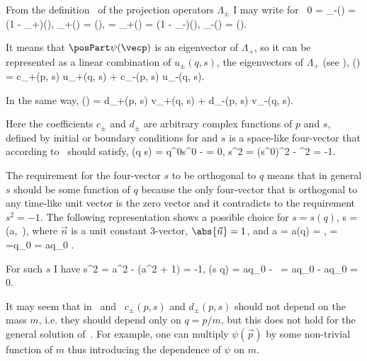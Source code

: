 From the definition~ of the projection operators 
$\Lambda_\pm$ I may write for~
0 = \Lambda_-\posPart\psi(\vecp) = (1 - \Lambda_+)\posPart\psi(\vecp),
\quad \Lambda_+\posPart\psi(\vecp) = \posPart\psi(\vecp),
\ee
{} = \Lambda_+\negPart\psi(\vecp) = (1 - \Lambda_-)\negPart\psi(\vecp),
\quad \Lambda_-\negPart\psi(\vecp) = \negPart\psi(\vecp).
\ee

It means that $\posPart\psi(\vecp)$ is an eigenvector of $\Lambda_+$,
so it can be represented as a linear combination of  $u_\pm(q, s)$,
the eigenvectors of $\Lambda_+$ (see ),
\posPart\psi(\vecp) = c_+(p, s) u_+(q, s) + c_-(p, s) u_-(q, s).
\ee

In the same way,
\negPart\psi(\vecp) = d_+(p, s) v_+(q, s) + d_-(p, s) v_-(q, s).
\ee

Here the coefficients $c_\pm$ and $d_\pm$ are arbitrary complex functions
of $p$ and $s$,
defined by initial or boundary conditions for 
and $s$ is a space-like four-vector that according to~
should satisfy, 
\be
(q \cdot s) = q^0s^0 -  = 0, 
\quad s^2 = (s^0)^2 - ^2 = -1.
\ee

The requirement for the four-vector $s$ to be orthogonal to $q$ means that 
in general $s$ should be some function of $q$ because the only four-vector
that is orthogonal to any time-like unit vector is the zero vector
and it contradicts to the requirement $s^2 = -1$. The following
representation shows a possible choice for $s = s(q)$,
\be
s = (a, \,), 
\ee
where $\vec{n}$ is a unit constant 3-vector, $\abs{\vec{n}} = 1$,
and
\be 
a = a(q) 
= { \cdot {} \over 
   }, 
\ee
\be
{} 
= 
={q_0 \over {}} 
= a{q_0 \over {} \cdot {}}
.      
\ee

For such $s$ I have
\be
s^2 = a^2 - (a^2 + 1) = -1, 
\ee
\be
(s \cdot q) = aq_0 - \,  \cdot {}
= aq_0 - a{q_0 \over {} \cdot {}}  \cdot {} = 0.
\ee
 
It may seem that in~ and~ 
$c_\pm(p, s)$ and $d_\pm(p, s)$ should not depend on the mass $m$, i.e.
they should depend only on $q = p/m$, but this does not hold for the general
solution of~. For example, one can multiply 
$\psi(\vec{p})$ by some non-trivial function of $m$ thus
introducing the dependence of $\psi$ on $m$.

